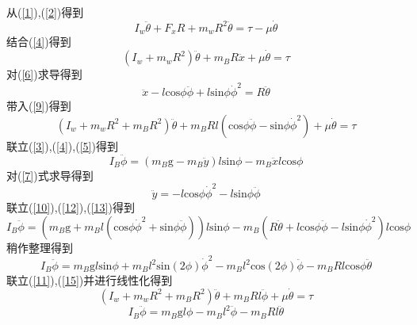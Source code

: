 \documentclass[UTF8,a4paper]{ctexart}
\begin{document}
从(\ref{1}),(\ref{2})得到
\begin{equation}
I_w\ddot{\theta}+F_xR+m_wR^2\ddot{\theta}=\tau-\mu\dot{\theta}
\label{8}
\end{equation}
结合(\ref{4})得到
\begin{equation}
(I_w+m_wR^2)\ddot{\theta}+m_BR\ddot{x}+\mu\dot{\theta}=\tau
\label{9}
\end{equation}
对(\ref{6})求导得到
\begin{equation}
\ddot{x}-l\mathrm{cos}\phi\ddot{\phi}+l\mathrm{sin}\phi\dot{\phi}^2=R\ddot{\theta}
\label{10}
\end{equation}
带入(\ref{9})得到
\begin{equation}
(I_w+m_wR^2+m_BR^2)\ddot{\theta}+m_BRl(\mathrm{cos}\phi\ddot{\phi}-\mathrm{sin}\phi\dot{\phi}^2)+\mu\dot{\theta}=\tau
\label{11}
\end{equation}
联立(\ref{3}),(\ref{4}),(\ref{5})得到
\begin{equation}
I_B\ddot{\phi}=(m_B\mathrm{g}-m_B\ddot{y})l\mathrm{sin}\phi-m_B\ddot{x}l\mathrm{cos}\phi
\label{12}
\end{equation}
对(\ref{7})式求导得到
\begin{equation}
\ddot{y}=-l\mathrm{cos}\phi\dot{\phi}^2-l\mathrm{sin}\phi\ddot{\phi}
\label{13}
\end{equation}
联立(\ref{10}),(\ref{12}),(\ref{13})得到
\begin{equation}
I_B\ddot{\phi}=(m_B\mathrm{g}+m_Bl(\mathrm{cos}\phi\dot{\phi}^2+\mathrm{sin}\phi\ddot{\phi}))l\mathrm{sin}\phi-m_B(R\ddot{\theta}+l\mathrm{cos}\phi\ddot{\phi}-l\mathrm{sin}\phi\dot{\phi}^2)l\mathrm{cos}\phi
\label{14}
\end{equation}
稍作整理得到
\begin{equation}
I_B\ddot{\phi}=m_B\mathrm{g}l\mathrm{sin}\phi + m_Bl^2\mathrm{sin}(2\phi) \dot{\phi}^2-m_Bl^2 \mathrm{cos}(2\phi)\ddot{\phi}-m_BRl\mathrm{cos}\phi\ddot{\theta}
\label{15}
\end{equation}
联立(\ref{11}),(\ref{15})并进行线性化得到
\begin{equation}
(I_w+m_wR^2+m_BR^2)\ddot{\theta}+m_BRl\ddot{\phi}+\mu\dot{\theta}=\tau
\label{16}
\end{equation}
\begin{equation}
I_B\ddot{\phi}=m_B\mathrm{g}l\phi-m_Bl^2 \ddot{\phi}-m_BRl\ddot{\theta}
\label{17}
\end{equation}
\end{document}
